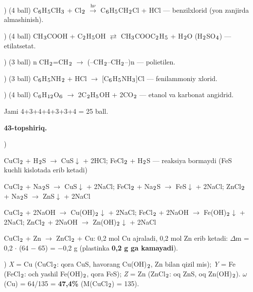 \documentclass[11pt,a4paper]{article}
\renewcommand{\textsubscript}[1]{\ensuremath{_{\text{\fontsize{8}{8}\selectfont #1}}}}
\begin{document}
) (4 ball) C\textsubscript{6}H\textsubscript{5}CH\textsubscript{3} + Cl\textsubscript{2} $\xrightarrow{\text{h$\nu$}}$ C\textsubscript{6}H\textsubscript{5}CH\textsubscript{2}Cl + HCl --- benzilxlorid (yon zanjirda almashinish).\par
{}) (4 ball) CH\textsubscript{3}COOH + C\textsubscript{2}H\textsubscript{5}OH $\rightleftarrows$ CH\textsubscript{3}COOC\textsubscript{2}H\textsubscript{5} + H\textsubscript{2}O (H\textsubscript{2}SO\textsubscript{4}) --- etilatsetat.\par
{}) (3 ball) n CH\textsubscript{2}=CH\textsubscript{2} $\to$ (--CH\textsubscript{2}--CH\textsubscript{2}--)n --- polietilen.\par
{}) (3 ball) C\textsubscript{6}H\textsubscript{5}NH\textsubscript{2} + HCl $\to$ [C\textsubscript{6}H\textsubscript{5}NH\textsubscript{3}]Cl --- fenilammoniy xlorid.\par
{}) (4 ball) C\textsubscript{6}H\textsubscript{12}O\textsubscript{6} $\to$ 2C\textsubscript{2}H\textsubscript{5}OH + 2CO\textsubscript{2} --- etanol va karbonat angidrid.\par
\noindent Jami 4+3+4+4+3+3+4 = 25 ball.\par
\noindent\textbf{43-topshiriq.}\par
{}) \par
\noindent CuCl\textsubscript{2} + H\textsubscript{2}S $\to$ CuS$\downarrow$ + 2HCl;  FeCl\textsubscript{2} + H\textsubscript{2}S --- reaksiya bormaydi (FeS kuchli kislotada erib ketadi)\par
\noindent CuCl\textsubscript{2} + Na\textsubscript{2}S $\to$ CuS$\downarrow$ + 2NaCl;  FeCl\textsubscript{2} + Na\textsubscript{2}S $\to$ FeS$\downarrow$ + 2NaCl;  ZnCl\textsubscript{2} + Na\textsubscript{2}S $\to$ ZnS$\downarrow$ + 2NaCl\par
\noindent CuCl\textsubscript{2} + 2NaOH $\to$ Cu(OH)\textsubscript{2}$\downarrow$ + 2NaCl;  FeCl\textsubscript{2} + 2NaOH $\to$ Fe(OH)\textsubscript{2}$\downarrow$ + 2NaCl;  ZnCl\textsubscript{2} + 2NaOH $\to$ Zn(OH)\textsubscript{2}$\downarrow$ + 2NaCl\par
\noindent CuCl\textsubscript{2} + Zn $\to$ ZnCl\textsubscript{2} + Cu: 0,2 mol Cu ajraladi, 0,2 mol Zn erib ketadi: $\Delta$m = 0,2 $\cdot$ (64 $-$ 65) = $-$0,2 g (plastinka \textbf{0,2 g ga kamayadi}).\par
{}) \textit{X} = Cu (CuCl\textsubscript{2}: qora CuS, havorang Cu(OH)\textsubscript{2}, Zn bilan qizil mis); \textit{Y} = Fe (FeCl\textsubscript{2}: och yashil Fe(OH)\textsubscript{2}, qora FeS); \textit{Z} = Zn (ZnCl\textsubscript{2}: oq ZnS, oq Zn(OH)\textsubscript{2}). $\omega$(Cu) = 64/135 = \textbf{47,4\%} (M(CuCl\textsubscript{2}) = 135).\par
\end{document}
